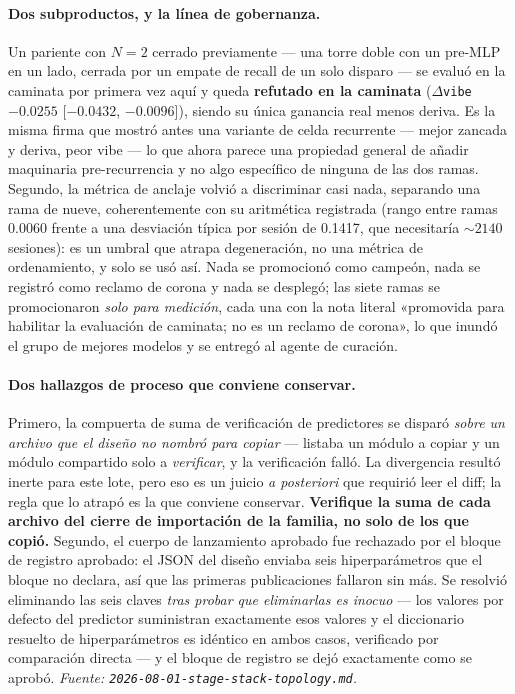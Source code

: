 \documentclass[11pt]{article}
\begin{document}
\paragraph{Dos subproductos, y la línea de gobernanza.} Un pariente con $N=2$
cerrado previamente --- una torre doble con un pre-MLP en un lado, cerrada por un
empate de recall de un solo disparo --- se evaluó en la caminata por primera vez aquí
y queda \textbf{refutado en la caminata} ($\Delta$\texttt{vibe} $-\num{0.0255}$
[$-\num{0.0432}$, $-\num{0.0096}$]), siendo su única ganancia real menos deriva. Es
la misma firma que mostró antes una variante de celda recurrente --- mejor zancada y
deriva, peor vibe --- lo que ahora parece una propiedad general de añadir maquinaria
pre-recurrencia y no algo específico de ninguna de las dos ramas. Segundo, la
métrica de anclaje volvió a discriminar casi nada, separando una rama de nueve,
coherentemente con su aritmética registrada (rango entre ramas \num{0.0060} frente a
una desviación típica por sesión de \num{0.1417}, que necesitaría
${\sim}\num{2140}$ sesiones): es un umbral que atrapa degeneración, no una métrica
de ordenamiento, y solo se usó así. Nada se promocionó como campeón, nada se
registró como reclamo de corona y nada se desplegó; las siete ramas se promocionaron
\emph{solo para medición}, cada una con la nota literal «promovida para habilitar la
evaluación de caminata; no es un reclamo de corona», lo que inundó el grupo de
mejores modelos y se entregó al agente de curación.

\paragraph{Dos hallazgos de proceso que conviene conservar.} Primero, la compuerta
de suma de verificación de predictores se disparó \emph{sobre un archivo que el
diseño no nombró para copiar} --- listaba un módulo a copiar y un módulo compartido
solo a \emph{verificar}, y la verificación falló. La divergencia resultó inerte para
este lote, pero eso es un juicio \emph{a posteriori} que requirió leer el diff; la
regla que lo atrapó es la que conviene conservar. \textbf{Verifique la suma de cada
archivo del cierre de importación de la familia, no solo de los que copió.}
Segundo, el cuerpo de lanzamiento aprobado fue rechazado por el bloque de registro
aprobado: el JSON del diseño enviaba seis hiperparámetros que el bloque no declara,
así que las primeras publicaciones fallaron sin más. Se resolvió eliminando las seis
claves \emph{tras probar que eliminarlas es inocuo} --- los valores por defecto del
predictor suministran exactamente esos valores y el diccionario resuelto de
hiperparámetros es idéntico en ambos casos, verificado por comparación directa --- y
el bloque de registro se dejó exactamente como se aprobó.
\emph{Fuente: \texttt{2026-08-01-stage-stack-topology.md}.}
\end{document}
